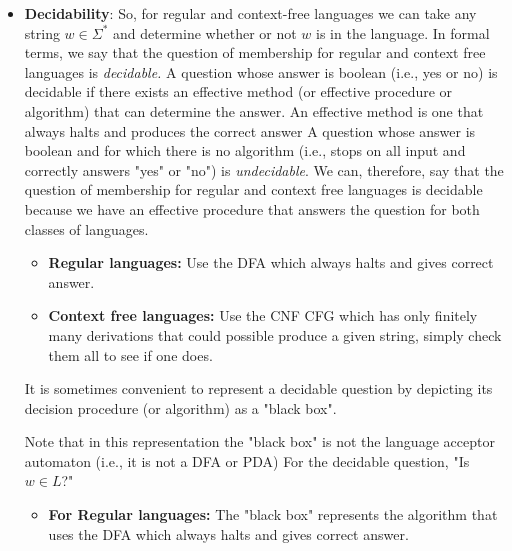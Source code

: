\documentclass{report}
\begin{document}
\begin{itemize}
\begin{enumerate}
            \end{enumerate}
        \item \textbf{Decidability}: So, for regular and context-free languages we can take any string $w \in \Sigma^{*}$ and determine whether or not $w$ is in the language.
            \bigbreak \noindent 
            In formal terms, we say that the question of membership for regular and context free languages is \textit{decidable.}
            \bigbreak \noindent 
            A question whose answer is boolean (i.e., yes or no) is decidable if there exists an effective method (or effective procedure or algorithm) that can determine the answer.
            \bigbreak \noindent 
            An effective method is one that always halts and produces the correct answer
            \bigbreak \noindent 
            A question whose answer is boolean and for which there is no algorithm (i.e., stops on all input and correctly answers "yes" or "no") is \textit{undecidable}.
            \bigbreak \noindent 
            We can, therefore, say that the question of membership for regular and context free languages is decidable because we have an effective procedure that answers the question for both classes of languages.
            \begin{itemize}
                \item \textbf{Regular languages:} Use the DFA which always halts and gives correct answer.
                \item \textbf{Context free languages:} Use the CNF CFG which has only finitely many derivations that could possible produce a given string, simply check them all to see if one does.
            \end{itemize}
            \bigbreak \noindent 
            It is sometimes convenient to represent a decidable question by depicting its decision procedure (or algorithm) as a "black box".
            \bigbreak \noindent 
            \begin{figure}[ht]
                \centering
                \label{fig:chekc1}
            \end{figure}
            \bigbreak \noindent 
            Note that in this representation the "black box" is not the language acceptor automaton (i.e., it is not a DFA or PDA)
            \bigbreak \noindent 
            For the decidable question, "Is $w\in L $?"
            \begin{itemize}
                \item \textbf{For Regular languages:} The "black box" represents the algorithm that uses the DFA which always halts and gives correct answer.

\end{itemize}
\end{itemize}
\end{document}
